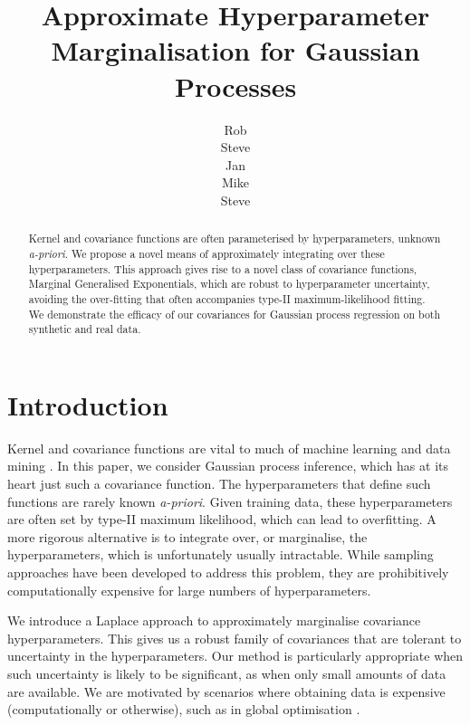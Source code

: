 \documentclass{article}
\title{Approximate Hyperparameter Marginalisation for Gaussian Processes}
\author{
Rob\\
\And
Steve\\
\And
Jan\\
\And
Mike\\
\And
Steve\\}
\begin{document}
\maketitle

\begin{abstract}
Kernel and covariance functions are often parameterised by hyperparameters, unknown {\it a-priori}. We propose a novel means of approximately integrating over these hyperparameters. This approach gives rise to a novel class of covariance functions, Marginal Generalised Exponentials, which are robust to hyperparameter uncertainty, avoiding the over-fitting that often accompanies type-II maximum-likelihood fitting. We demonstrate the efficacy of our covariances for Gaussian process regression on both synthetic and real data.
\end{abstract}


\section{Introduction}

Kernel and covariance functions are vital to much of machine learning and data mining \citep{shawe2004kernel}. In this paper, we consider Gaussian process \citep{rassandwill} inference, which has at its heart just such a covariance function. The hyperparameters that define such functions are rarely known {\it a-priori}. Given training data, these hyperparameters are often set by type-II maximum likelihood, which can lead to overfitting. A more rigorous alternative is to integrate over, or marginalise, the hyperparameters, which is unfortunately usually intractable. While sampling approaches \citep{neal1997monte} have been developed to address this problem, they are prohibitively computationally expensive for large numbers of hyperparameters. 

We introduce a Laplace approach to approximately marginalise covariance hyperparameters. This gives us a robust family of covariances that are tolerant to uncertainty in the hyperparameters. Our method is particularly appropriate when such uncertainty is likely to be significant, as when only small amounts of data are available. We are motivated by scenarios where obtaining data is expensive (computationally or otherwise), such as in global optimisation \citep{osborne2009gaussian}. 
\end{document}
